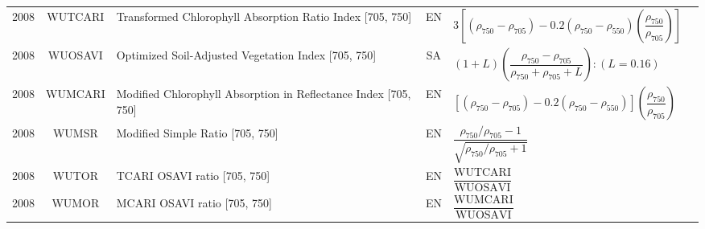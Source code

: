 \documentclass[10pt]{article}
\begin{document}
\begin{ThreePartTable}
\begin{longtable}{c c m{2.3in} c M{2.8in} M{1.5in}}
  2008 & WUTCARI & Transformed Chlorophyll Absorption Ratio Index [705, 750]                      & EN & $3\left[(\rho_{750}-\rho_{705})-0.2(\rho_{750}-\rho_{550})\left(\dfrac{\rho_{750}}{\rho_{705}}\right)\right]$                                                                                                                                                                           & \citet{Wu2008}                                      \\
  2008 & WUOSAVI & Optimized Soil-Adjusted Vegetation Index [705, 750]                            & SA & $(1 + L)\left(\dfrac{\rho_{750}-\rho_{705}}{\rho_{750}+\rho_{705}+L}\right):(L=0.16)$                                                                                                                                                                                                   & \citet{Wu2008}                                      \\
  2008 & WUMCARI & Modified Chlorophyll Absorption in Reflectance Index [705, 750]                & EN & $\left[(\rho_{750}-\rho_{705})-0.2(\rho_{750}-\rho_{550})\right]\left(\dfrac{\rho_{750}}{\rho_{705}}\right)$                                                                                                                                                                            & \citet{Wu2008}                                      \\
  2008 & WUMSR   & Modified Simple Ratio [705, 750]                                               & EN & $\dfrac{\rho_{750}/\rho_{705}-1}{\sqrt{\rho_{750}/\rho_{705}+1}}$                                                                                                                                                                                                                       & \citet{Wu2008}                                      \\
  2008 & WUTOR   & TCARI OSAVI ratio [705, 750]                                                   & EN & $\dfrac{\text{WUTCARI}}{\text{WUOSAVI}}$                                                                                                                                                                                                                                                & \citet{Wu2008}                                      \\
  2008 & WUMOR   & MCARI OSAVI ratio [705, 750]                                                   & EN & $\dfrac{\text{WUMCARI}}{\text{WUOSAVI}}$                                                                                                                                                                                                                                                & \citet{Wu2008}                                      \\

\end{longtable}
\end{ThreePartTable}
\end{document}
